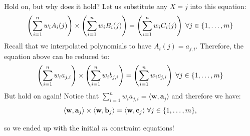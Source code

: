 \documentclass{zkdl-presentation-template}
\begin{document}
    \begin{frame}
        Hold on, but why does it hold? Let us substitute any $X=j$ into this equation:
        \vspace{-5pt}
        \begin{equation*}
            \left( \sum_{i = 1}^{n} w_iA_i(j) \right) \times \left( \sum_{i = 1}^{n} w_iB_i(j) \right) = \left( \sum_{i = 1}^{n} w_iC_i(j) \right) \; \forall j \in \{1,\dots,m\}
            \vspace{-5pt}
        \end{equation*}
        \pause
        Recall that we interpolated polynomials to have $A_i(j) = a_{j,i}$. Therefore, the equation above can be reduced to:
        \vspace{-5pt}
        \begin{equation*}
            \left( \sum_{i = 1}^{n} w_ia_{j,i} \right) \times \left( \sum_{i = 1}^{n} w_ib_{j,i} \right) = \left( \sum_{i = 1}^{n} w_ic_{j,i} \right) \; \forall j \in \{1,\dots,m\}
            \vspace{-5pt}
        \end{equation*}
        \pause
        But hold on again! Notice that $\sum_{i = 1}^{n} w_ia_{j,i} = \langle \mathbf{w}, \mathbf{a}_j \rangle$ and therefore we have:
        \vspace{-5pt}
        \begin{equation*}
            \langle \mathbf{w}, \mathbf{a}_j \rangle \times \langle \mathbf{w}, \mathbf{b}_j \rangle = \langle \mathbf{w}, \mathbf{c}_j \rangle \; \forall j \in \{1,\dots,m\},
            \vspace{-5pt}
        \end{equation*}
        
        so we ended up with the initial $m$ constraint equations!       
    \end{frame}
\end{document}
